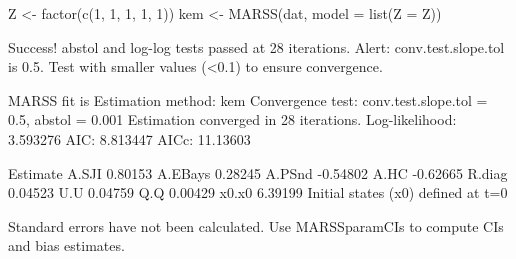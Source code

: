 \begin{Schunk}
\begin{Sinput}
 Z <- factor(c(1, 1, 1, 1, 1))
 kem <- MARSS(dat, model = list(Z = Z))
\end{Sinput}
\begin{Soutput}
Success! abstol and log-log tests passed at 28 iterations.
Alert: conv.test.slope.tol is 0.5.
Test with smaller values (<0.1) to ensure convergence.

MARSS fit is
Estimation method: kem 
Convergence test: conv.test.slope.tol = 0.5, abstol = 0.001
Estimation converged in 28 iterations. 
Log-likelihood: 3.593276 
AIC: 8.813447   AICc: 11.13603   
 
        Estimate
A.SJI    0.80153
A.EBays  0.28245
A.PSnd  -0.54802
A.HC    -0.62665
R.diag   0.04523
U.U      0.04759
Q.Q      0.00429
x0.x0    6.39199
Initial states (x0) defined at t=0

Standard errors have not been calculated. 
Use MARSSparamCIs to compute CIs and bias estimates.
\end{Soutput}
\end{Schunk}

